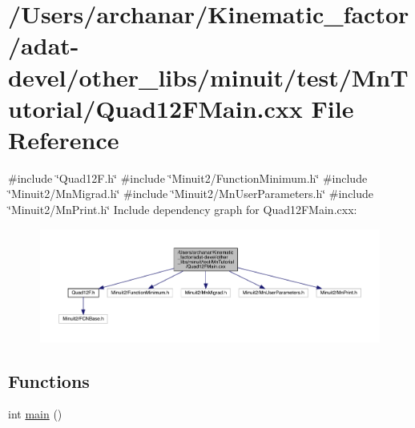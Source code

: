 \hypertarget{adat-devel_2other__libs_2minuit_2test_2MnTutorial_2Quad12FMain_8cxx}{}\section{/\+Users/archanar/\+Kinematic\+\_\+factor/adat-\/devel/other\+\_\+libs/minuit/test/\+Mn\+Tutorial/\+Quad12\+F\+Main.cxx File Reference}
\label{adat-devel_2other__libs_2minuit_2test_2MnTutorial_2Quad12FMain_8cxx}
{\ttfamily \#include \char`\"{}Quad12\+F.\+h\char`\"{}}\newline
{\ttfamily \#include \char`\"{}Minuit2/\+Function\+Minimum.\+h\char`\"{}}\newline
{\ttfamily \#include \char`\"{}Minuit2/\+Mn\+Migrad.\+h\char`\"{}}\newline
{\ttfamily \#include \char`\"{}Minuit2/\+Mn\+User\+Parameters.\+h\char`\"{}}\newline
{\ttfamily \#include \char`\"{}Minuit2/\+Mn\+Print.\+h\char`\"{}}\newline
Include dependency graph for Quad12\+F\+Main.\+cxx\+:
\nopagebreak
\begin{figure}[H]
\begin{center}
\leavevmode
\includegraphics[width=350pt]{da/dbd/adat-devel_2other__libs_2minuit_2test_2MnTutorial_2Quad12FMain_8cxx__incl}
\end{center}
\end{figure}
\subsection*{Functions}
\begin{DoxyCompactItemize}
\item 
int \mbox{\hyperlink{adat-devel_2other__libs_2minuit_2test_2MnTutorial_2Quad12FMain_8cxx_ae66f6b31b5ad750f1fe042a706a4e3d4}{main}} ()
\end{DoxyCompactItemize}


